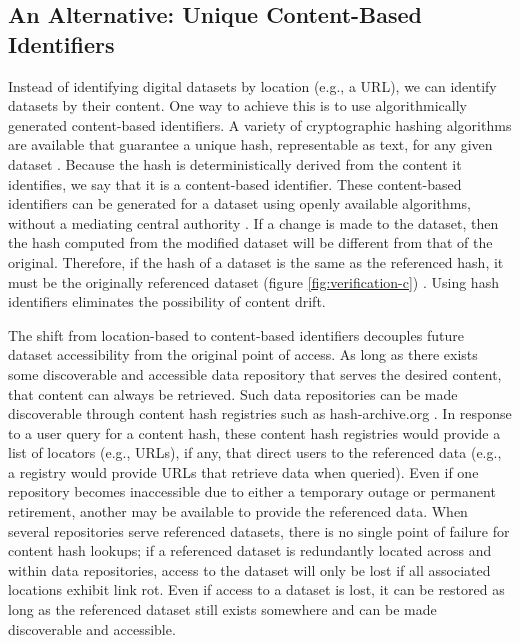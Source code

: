 \subsection*{An Alternative: Unique Content-Based Identifiers}
Instead of identifying digital datasets by location (e.g., a URL), we can identify datasets by their content. One way to achieve this is to use algorithmically generated content-based identifiers. A variety of cryptographic hashing algorithms are available that guarantee a unique hash, representable as text, for any given dataset . Because the hash is deterministically derived from the content it identifies, we say that it is a content-based identifier. These content-based identifiers can be generated for a dataset using openly available algorithms, without a mediating central authority \citep{Paskin_1999}. If a change is made to the dataset, then the hash computed from the modified dataset will be different from that of the original. Therefore, if the hash of a dataset is the same as the referenced hash, it must be the originally referenced dataset (figure \ref{fig:verification-c}) . Using hash identifiers eliminates the possibility of content drift.


The shift from location-based to content-based identifiers decouples future dataset accessibility from the original point of access. As long as there exists some discoverable and accessible data repository that serves the desired content, that content can always be retrieved. Such data repositories can be made discoverable through content hash registries such as hash-archive.org \citep{Trask_2015}. In response to a user query for a content hash, these content hash registries would provide a list of locators (e.g., URLs), if any, that direct users to the referenced data (e.g., a registry would provide URLs that retrieve data when queried). Even if one repository becomes inaccessible due to either a temporary outage or permanent retirement, another may be available to provide the referenced data. When several repositories serve referenced datasets, there is no single point of failure for content hash lookups; if a referenced dataset is redundantly located across and within data repositories, access to the dataset will only be lost if all associated locations exhibit link rot. Even if access to a dataset is lost, it can be restored as long as the referenced dataset still exists somewhere and can be made discoverable and accessible.

